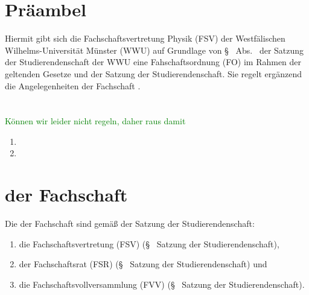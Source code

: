 \documentclass[
	a4paper,
	12pt,
	oneside,
	parskip=half-,
	pagesize,
	headsepline,
	german,
	ngerman
]{scrartcl}
\begin{document}
\section{Präambel}
Hiermit gibt sich die Fachschaftsvertretung Physik (FSV) der Westfälischen Wilhelms-Universi\-tät Münster (WWU) auf Grundlage von §~ Abs.~ der Satzung der Studierendenschaft der WWU eine Fahschaftsordnung (FO) im Rahmen der geltenden Gesetze und der Satzung der Studierendenschaft. Sie regelt ergänzend die Angelegenheiten der Fachschaft .


\section{}
\textcolor{green}{Können wir leider nicht regeln, daher raus damit}
\begin{enumerate}
	\item {}
	\item {}
\end{enumerate}

\setcounter{section}{1}
\section{ der Fachschaft}
Die  der Fachschaft sind gemäß der Satzung der Studierendenschaft:
\begin{enumerate}
	\item die Fachschaftsvertretung (FSV) (§~ Satzung der Studierendenschaft),
	\item der Fachschaftsrat (FSR) (§~ Satzung der Studierendenschaft) und 
	\item die Fachschaftsvollversammlung (FVV) (§~ Satzung der Studierendenschaft).
\end{enumerate}
\end{document}
